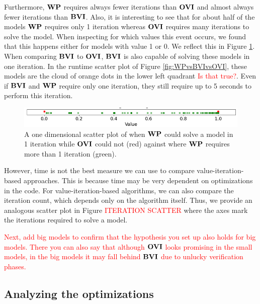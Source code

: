 Furthermore, $\mathbf{WP}$ requires always fewer iterations than $\OVI$ and almost always fewer iterations than $\mathbf{BVI}$. 
Also, it is interesting to see that for about half of the models $\mathbf{WP}$ requires only 1 iteration whereas $\OVI$ requires many iterations to solve the model.
When inspecting for which values this event occurs, we found that this happens either for models with value 1 or 0.
We reflect this in Figure \ref{fig:OVIinstantCompute}. When comparing $\mathbf{BVI}$ to $\OVI$, $\mathbf{BVI}$ is also capable of solving these models in one iteration.
In the runtime scatter plot of Figure \ref{fig:WPvsBVIvsOVI}, these models are the cloud of orange dots in the lower left quadrant \textcolor{red}{Is that true?}.
Even if $\mathbf{BVI}$ and $\mathbf{WP}$ require only one iteration, they still require up to 5 seconds to perform this iteration.

\begin{figure}[h!]
    \centering
    \includegraphics[width=1\textwidth]{figures/OVI_Bad_At_Computing_Instant_Values.png}
    \caption[$\OVI$ cannot instantly compute models]{
        A one dimensional scatter plot of when $\mathbf{WP}$ could solve a model in 1 iteration while $\OVI$ could not (red) 
        against where $\mathbf{WP}$ requires more than 1 iteration (green).
    }
    \label{fig:OVIinstantCompute}
\end{figure}
\FloatBarrier

However, time is not the best measure we can use to compare value-iteration-based approaches. 
This is because time may be very dependent on optimizations in the code. 
For value-iteration-based algorithms, we can also compare the iteration count, which depends only on the algorithm itself.
Thus, we provide an analogous scatter plot in Figure \textcolor{red}{ITERATION SCATTER} where the axes mark the iterations required to solve a model.

\textcolor{red}{Next, add big models to confirm that the hypothesis you set up also holds for big models. 
There you can also say that although $\OVI$ looks promising in the small models, in the big models it may fall behind $\mathbf{BVI}$ due to unlucky verification phases.}

\subsection{Analyzing the optimizations}

